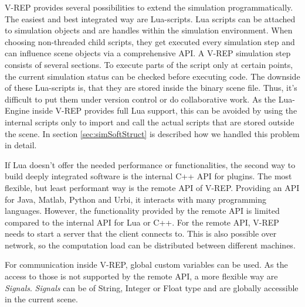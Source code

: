     V-REP provides several possibilities to extend the simulation programmatically. 
    The easiest and best integrated way are Lua-scripts. Lua scripts can be attached to simulation objects and are handles within the simulation environment. 
    When choosing non-threaded child scripts, they get executed every simulation step and can influence scene objects via a comprehensive API. 
    A V-REP simulation step consists of several sections. 
    To execute parts of the script only at certain points, the current simulation status can be checked before executing code.  
    The downside of these Lua-scripts is, that they are stored inside the binary scene file. 
    Thus, it's difficult to put them under version control or do collaborative work. 
    As the Lua-Engine inside V-REP provides full Lua support, this can be avoided by using the internal scripts only to import and call the actual scripts that are stored outside the scene. 
    In section \ref{sec:simSoftStruct} is described how we handled this problem in detail.
    
    If Lua doesn't offer the needed performance or functionalities, the second way to build deeply integrated software is the internal C++ API for plugins.
    The most flexible, but least performant way is the remote API of V-REP.
    Providing an API for Java, Matlab, Python and Urbi, it interacts with many programming languages.
    However, the functionality provided by the remote API is limited compared to the internal API for Lua or C++.
    For the remote API, V-REP needs to start a server that the client connects to.
    This is also possible over network, so the computation load can be distributed between different machines.
    
    For communication inside V-REP, global custom variables can be used. As the access to those is not supported by the remote API, a more flexible way are \emph{Signals}. \emph{Signals} can be of String, Integer or Float type and are globally accessible  in the current scene. 
    
    


    
    
